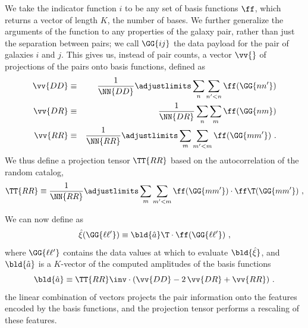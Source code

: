 We take the indicator function $i$ to be any set of basis functions $\ff$, which returns a vector of length $K$, the number of bases.
We further generalize the arguments of the function to any properties of the galaxy pair, rather than just the separation between pairs; we call $\GG{ij}$ the data payload for the pair of galaxies $i$ and $j$.
This gives us, instead of pair counts, a vector $\vv{}$ of projections of the pairs onto basis functions, defined as
\begin{eqnarray}\displaystyle
    \label{eq:vdd}
    \vv{DD} &\equiv& \frac{1}{\NN{DD}} \adjustlimits \sum_{n} \sum_{n'<n} \ff(\GG{n n'}) \\
    \label{eq:vdr}
    \vv{DR} &\equiv& \frac{1}{\NN{DR}} \sum_{n} \sum_{m} \ff(\GG{n m}) \\
    \label{eq:vrr}
    \vv{RR} &\equiv& \frac{1}{\NN{RR}} \adjustlimits \sum_{m} \sum_{m'<m} \ff(\GG{m m'}) ~.
\end{eqnarray}
We thus define a projection tensor $\TT{RR}$ based on the autocorrelation of the random catalog, 
\begin{equation}
    \label{eq:Trr}
    \TT{RR} \equiv \frac{1}{\NN{RR}} \adjustlimits \sum_{m} \sum_{m'<m} \ff(\GG{m m'}) \cdot \ff\T(\GG{m m'}) ~,
\end{equation}

We can now define \est as
\begin{equation}
    \label{eq:xi_proj}
    \hat{\xi}(\GG{\ell \ell'}) \equiv \bld{\hat a}\T \cdot \ff(\GG{\ell \ell'}) ~,
\end{equation}
where $\GG{\ell \ell'}$ contains the data values at which to evaluate $\bld{\hat{\xi}}$, and $\bld{\hat a}$ is a $K$-vector of the computed amplitudes of the basis functions
\begin{equation}
    \label{eq:amplitude}
    \bld{\hat a} \equiv \TT{RR}\inv \cdot (\vv{DD} - 2\,\vv{DR} + \vv{RR}) ~.
\end{equation}
 the linear combination of vectors projects the pair information onto the features encoded by the basis functions, and the projection tensor performs a rescaling of these features.

